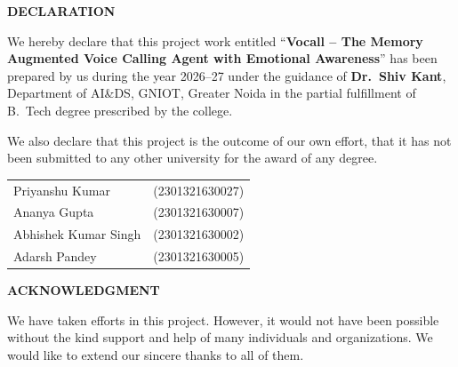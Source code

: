 \documentclass[12pt,a4paper]{article}
\begin{document}
\newpage
\thispagestyle{empty}
\begin{center}
    \vspace*{0.5cm}
    {\fontsize{16}{20}\selectfont \textbf{DECLARATION}}\\[1.2cm]
\end{center}

We hereby declare that this project work entitled ``\textbf{Vocall -- The Memory Augmented Voice Calling Agent with Emotional Awareness}'' has been prepared by us during the year 2026--27 under the guidance of \textbf{Dr.~Shiv Kant}, Department of AI\&DS, GNIOT, Greater Noida in the partial fulfillment of B.~Tech degree prescribed by the college.

\vspace{0.8cm}

We also declare that this project is the outcome of our own effort, that it has not been submitted to any other university for the award of any degree.

\vspace{3.0cm}

\begin{flushright}
\begin{minipage}{0.55\textwidth}
    \begin{tabular}{@{}l l@{}}
        Priyanshu Kumar & (2301321630027) \\[0.25cm]
        Ananya Gupta & (2301321630007) \\[0.25cm]
        Abhishek Kumar Singh & (2301321630002) \\[0.25cm]
        Adarsh Pandey & (2301321630005)
    \end{tabular}
\end{minipage}
\end{flushright}

\newpage
\thispagestyle{empty}
\begin{center}
    \vspace*{0.5cm}
    {\fontsize{16}{20}\selectfont \textbf{ACKNOWLEDGMENT}}\\[1.2cm]
\end{center}

We have taken efforts in this project. However, it would not have been possible without the kind support and help of many individuals and organizations. We would like to extend our sincere thanks to all of them.

\vspace{0.6cm}
\end{document}
